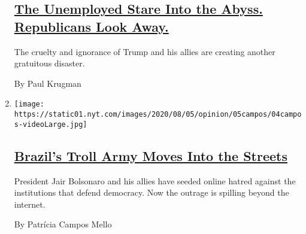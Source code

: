 \begin{enumerate}
  \hypertarget{the-unemployed-stare-into-the-abyss-republicans-look-away}{%
  \subsection{\texorpdfstring{\href{/2020/08/03/opinion/republicans-unemployed-coronavirus.html}{The
  Unemployed Stare Into the Abyss. Republicans Look
  Away.}}{The Unemployed Stare Into the Abyss. Republicans Look Away.}}\label{the-unemployed-stare-into-the-abyss-republicans-look-away}}

  The cruelty and ignorance of Trump and his allies are creating another
  gratuitous disaster.

  By Paul Krugman
\item
  \texttt{[image: https://static01.nyt.com/images/2020/08/05/opinion/05campos/04campos-videoLarge.jpg]}

  \hypertarget{brazils-troll-army-moves-into-the-streets}{%
  \subsection{\texorpdfstring{\href{/2020/08/04/opinion/bolsonaro-office-of-hate-brazil.html}{Brazil's
  Troll Army Moves Into the
  Streets}}{Brazil's Troll Army Moves Into the Streets}}\label{brazils-troll-army-moves-into-the-streets}}

  President Jair Bolsonaro and his allies have seeded online hatred
  against the institutions that defend democracy. Now the outrage is
  spilling beyond the internet.

  By Patrícia Campos Mello
\end{enumerate}

